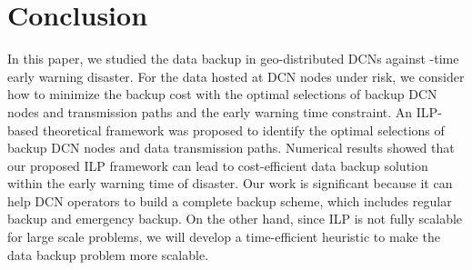 \documentclass[conference]{IEEEtran}\IEEEoverridecommandlockouts
\begin{document}
 \section{Conclusion}\label{conclusion}
In this paper, we studied the data backup in geo-distributed DCNs against -time early warning disaster. For the data hosted at DCN nodes under risk, we consider how to minimize the backup cost with the  optimal selections of backup DCN nodes  and transmission paths and the early warning time constraint. An  ILP-based theoretical framework was proposed to identify the optimal selections of backup DCN nodes and data transmission paths. Numerical results showed that our proposed ILP framework can lead to cost-efficient data backup solution within the early warning time of disaster.  Our work is significant because it can  help DCN operators to build a complete backup scheme, which includes regular backup and emergency backup.  On the other hand, since ILP is not fully scalable for large scale problems, we will develop a time-efficient heuristic to make the data backup problem more scalable.















\ifCLASSOPTIONcaptionsoff
  \newpage
\fi


\end{document}
